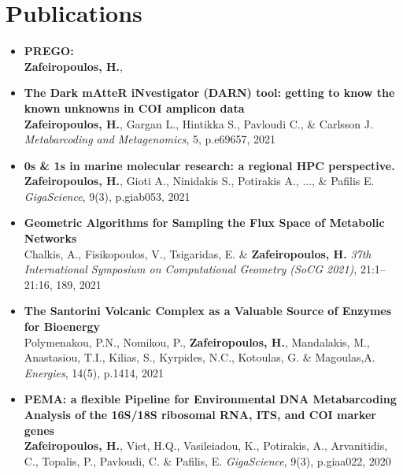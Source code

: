 
\section*{Publications}

\begin{itemize}

   \item{
      \textbf{PREGO: } \\ 
      \textbf{Zafeiropoulos, H.},
   }



   \item{
      \textbf{The Dark mAtteR iNvestigator (DARN) tool: getting to know the known unknowns in COI amplicon data} \\
      \textbf{Zafeiropoulos, H.}, Gargan L., Hintikka S., Pavloudi C., \& Carlsson J. \textit{Metabarcoding and Metagenomics}, 5, p.e69657, 2021
   }

   \item{
      \textbf{0s \& 1s in marine molecular research: a regional HPC perspective.} \\
      \textbf{Zafeiropoulos, H.}, Gioti A., Ninidakis S., Potirakis A., ..., \& Pafilis E. \textit{GigaScience},  9(3), p.giab053, 2021
   }

   \item{
      \textbf{Geometric Algorithms for Sampling the Flux Space of Metabolic Networks} \\
      Chalkis, A., Fisikopoulos, V., Tsigaridas, E. \& \textbf{Zafeiropoulos, H.} \textit{37th International Symposium on Computational Geometry (SoCG 2021)}, 21:1--21:16, 189, 2021
   }

   \item{
      \textbf{The Santorini Volcanic Complex as a Valuable Source of Enzymes for Bioenergy} \\ 
      Polymenakou, P.N., Nomikou, P., \textbf{Zafeiropoulos, H.}, Mandalakis, M., Anastasiou, T.I., Kilias, S., Kyrpides, N.C., Kotoulas, G. \& Magoulas,A. \textit{Energies}, 14(5), p.1414, 2021
   }

   \item{
      \textbf{PEMA: a flexible Pipeline for Environmental DNA Metabarcoding Analysis of the 16S/18S ribosomal RNA, ITS, and COI marker genes} \\ 
      \textbf{Zafeiropoulos, H.}, Viet, H.Q., Vasileiadou, K., Potirakis, A., Arvanitidis, C., Topalis, P., Pavloudi, C. \& Pafilis, E. \textit{GigaScience}, 9(3), p.giaa022, 2020
   }

\end{itemize}









